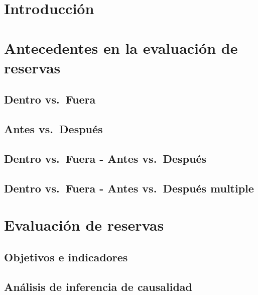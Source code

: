 \documentclass[]{book}
\begin{document}
\hypertarget{introduccion}{%
\chapter{Introducción}\label{introduccion}}

\hypertarget{antecedentes-en-la-evaluacion-de-reservas}{%
\chapter{Antecedentes en la evaluación de
reservas}\label{antecedentes-en-la-evaluacion-de-reservas}}

\hypertarget{dentro-vs.fuera}{%
\section{Dentro vs.~Fuera}\label{dentro-vs.fuera}}

\hypertarget{antes-vs.despues}{%
\section{Antes vs.~Después}\label{antes-vs.despues}}

\hypertarget{dentro-vs.fuera---antes-vs.despues}{%
\section{Dentro vs.~Fuera - Antes
vs.~Después}\label{dentro-vs.fuera---antes-vs.despues}}

\hypertarget{dentro-vs.fuera---antes-vs.despues-multiple}{%
\section{Dentro vs.~Fuera - Antes vs.~Después
multiple}\label{dentro-vs.fuera---antes-vs.despues-multiple}}

\hypertarget{evaluacion-de-reservas}{%
\chapter{Evaluación de reservas}\label{evaluacion-de-reservas}}

\hypertarget{objetivos-e-indicadores}{%
\section{Objetivos e indicadores}\label{objetivos-e-indicadores}}

\hypertarget{analisis-de-inferencia-de-causalidad}{%
\section{Análisis de inferencia de
causalidad}\label{analisis-de-inferencia-de-causalidad}}
\end{document}
